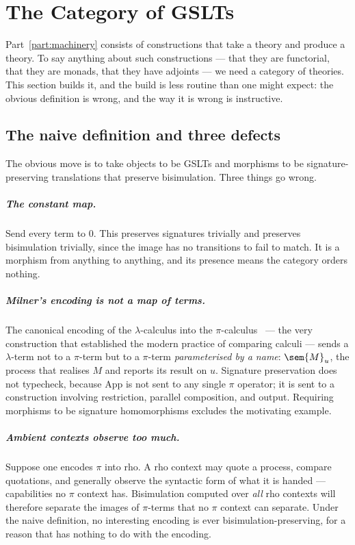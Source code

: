 \chapter{The Category of GSLTs}
\label{ch:catgslt}

Part~\ref{part:machinery} consists of constructions that take a theory and produce a theory. To say
anything about such constructions --- that they are functorial, that they are monads,
that they have adjoints --- we need a category of theories. This section builds it, and
the build is less routine than one might expect: the obvious definition is wrong, and
the way it is wrong is instructive.

\section{The naive definition and three defects}

The obvious move is to take objects to be GSLTs and morphisms to be signature-preserving
translations that preserve bisimulation. Three things go wrong.

\paragraph{The constant map.} Send every term to $0$. This preserves signatures
trivially and preserves bisimulation trivially, since the image has no transitions to
fail to match. It is a morphism from anything to anything, and its presence means the
category orders nothing.

\paragraph{Milner's encoding is not a map of terms.} The canonical encoding of the
$\lambda$-calculus into the $\pi$-calculus~\cite{Milner1992} --- the very construction
that established the modern practice of comparing calculi --- sends a $\lambda$-term not
to a $\pi$-term but to a $\pi$-term \emph{parameterised by a name}: $\sem{M}_u$, the
process that realises $M$ and reports its result on $u$. Signature preservation does not
typecheck, because $\mathrm{App}$ is not sent to any single $\pi$ operator; it is sent to
a construction involving restriction, parallel composition, and output. Requiring
morphisms to be signature homomorphisms excludes the motivating example.

\paragraph{Ambient contexts observe too much.} Suppose one encodes $\pi$ into rho. A rho
context may quote a process, compare quotations, and generally observe the syntactic
form of what it is handed --- capabilities no $\pi$ context has. Bisimulation computed
over \emph{all} rho contexts will therefore separate the images of $\pi$-terms that no
$\pi$ context can separate. Under the naive definition, no interesting encoding is ever
bisimulation-preserving, for a reason that has nothing to do with the encoding.

